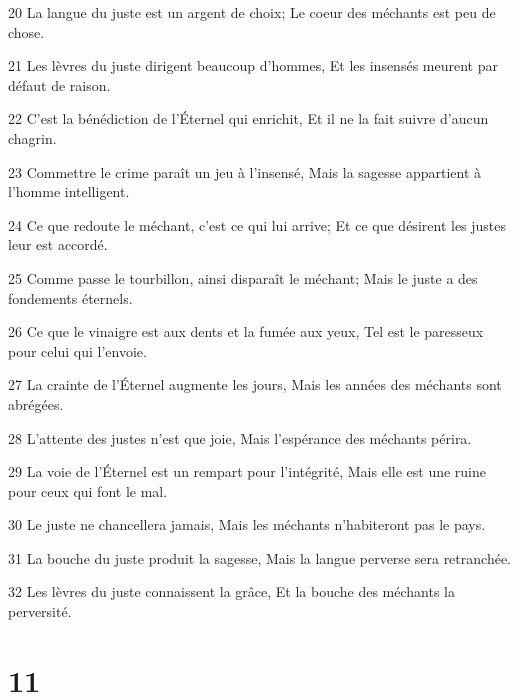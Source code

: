 \par 20 La langue du juste est un argent de choix; Le coeur des méchants est peu de chose.
\par 21 Les lèvres du juste dirigent beaucoup d'hommes, Et les insensés meurent par défaut de raison.
\par 22 C'est la bénédiction de l'Éternel qui enrichit, Et il ne la fait suivre d'aucun chagrin.
\par 23 Commettre le crime paraît un jeu à l'insensé, Mais la sagesse appartient à l'homme intelligent.
\par 24 Ce que redoute le méchant, c'est ce qui lui arrive; Et ce que désirent les justes leur est accordé.
\par 25 Comme passe le tourbillon, ainsi disparaît le méchant; Mais le juste a des fondements éternels.
\par 26 Ce que le vinaigre est aux dents et la fumée aux yeux, Tel est le paresseux pour celui qui l'envoie.
\par 27 La crainte de l'Éternel augmente les jours, Mais les années des méchants sont abrégées.
\par 28 L'attente des justes n'est que joie, Mais l'espérance des méchants périra.
\par 29 La voie de l'Éternel est un rempart pour l'intégrité, Mais elle est une ruine pour ceux qui font le mal.
\par 30 Le juste ne chancellera jamais, Mais les méchants n'habiteront pas le pays.
\par 31 La bouche du juste produit la sagesse, Mais la langue perverse sera retranchée.
\par 32 Les lèvres du juste connaissent la grâce, Et la bouche des méchants la perversité.

\chapter{11}

